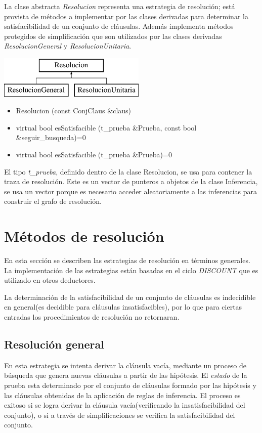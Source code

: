 \documentclass[a4paper,12pt]{article}
\begin{document}
La clase abstracta \emph{Resolucion} representa una estrategia de resolución; está provista de métodos a 
implementar por las clases derivadas para determinar la satisfacibilidad de un conjunto de cláusulas. 
Además implementa métodos protegidos de simplificación que son utilizados por las clases derivadas \emph{ResolucionGeneral}
y \emph{ResolucionUnitaria}.
\begin{center}
\leavevmode
\includegraphics[height=2cm]{imagenes/classResolucion}
\end{center}
\begin{itemize}
\renewcommand{\labelitemi}{$\bullet$}
\item Resolucion (const ConjClaus \&claus)
\item virtual bool esSatisfacible (t\_prueba \&Prueba, const bool \&seguir\_busqueda)=0
\item virtual bool esSatisfacible (t\_prueba \&Prueba)=0
\end{itemize}
El tipo \emph{t\_prueba}, definido dentro de la clase Resolucion, se usa para contener la traza de
resolución. Este es un vector de punteros a objetos de la clase Inferencia, se usa un vector porque
es necesario acceder aleatoriamente a las inferencias para construir el grafo de resolución.
\section{Métodos de resolución}
En esta sección se describen las estrategias de resolución en términos generales. La implementación
de las estrategias están basadas en el ciclo \emph{DISCOUNT}\cite{Schultz} que es utilizado
en otros deductores.

La determinación de la satisfacibilidad de un conjunto de cláusulas es indecidible en general(es decidible 
para cláusulas insatisfacibles), por lo que para ciertas entradas los
procedimientos de resolución no retornaran.
\subsection{Resolución general}
En esta estrategia se intenta derivar la cláusula vacía, mediante un proceso de búsqueda
que genera nuevas cláusulas a partir de las hipótesis. El \emph{estado} de la prueba esta
determinado por el conjunto de cláusulas formado por las hipótesis y las cláusulas obtenidas de la aplicación de 
reglas de inferencia. El proceso es exitoso si se logra derivar la cláusula
vacía(verificando la insatisfacibilidad del conjunto), o si a través de simplificaciones se verifica la satisfacibilidad del conjunto.
\end{document}

